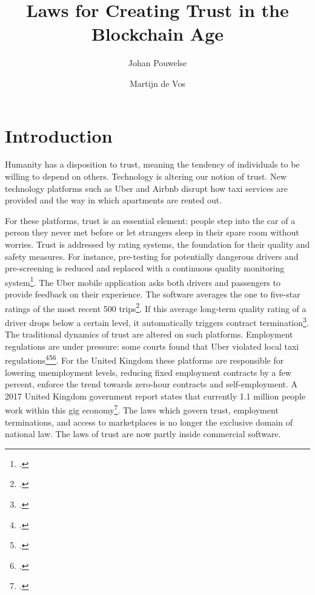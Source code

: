 \documentclass[USenglish]{article}
\begin{document}

  \author*[1]{Johan Pouwelse}
  \author[2]{Martijn de Vos}
  \title{Laws for Creating Trust in the Blockchain Age}

\maketitle

\section{Introduction}
Humanity has a disposition to trust, meaning the tendency of individuals to be willing to depend on others.
Technology is altering our notion of trust.
New technology platforms such as Uber and Airbnb disrupt how taxi services are provided and the way in which apartments are rented out.

For these platforms, trust is an essential element: people step into the car of a person they never met before or let strangers sleep in their spare room without worries.
Trust is addressed by rating systems, the foundation for their quality and safety measures.
For instance, pre-testing for potentially dangerous drivers and pre-screening is reduced and replaced with a continuous quality monitoring system\footcite{uberfivestar}.
The Uber mobile application asks both drivers and passengers to provide feedback on their experience.
The software averages the one to five-star ratings of the most recent 500 trips\footcite{uberratinghelp}.
If this average long-term quality rating of a driver drops below a certain level, it automatically triggers contract termination\footcite{forbesuserfiring}. 
The traditional dynamics of trust are altered on such platforms.
Employment regulations are under pressure: some courts found that Uber violated local taxi regulations\footcite{ftuberregulation}\footcite{reutersuberdanish}\footcite{reutersubersouthkorea}.
For the United Kingdom these platforms are responsible for lowering unemployment levels, reducing fixed employment contracts by a few percent, enforce the trend towards zero-hour contracts and self-employment.
A 2017 United Kingdom government report states that currently 1.1 million people work within this gig economy\footcite{goodgigs}.
The laws which govern trust, employment terminations, and access to marketplaces is no longer the exclusive domain of national law.
The laws of trust are now partly inside commercial software.
\end{document}
